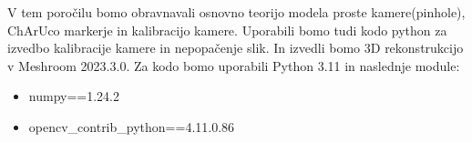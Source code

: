 V tem poročilu bomo obravnavali osnovno teorijo modela proste kamere(pinhole), ChArUco markerje in kalibracijo kamere. Uporabili bomo tudi kodo python za izvedbo kalibracije kamere in nepopačenje slik. In izvedli bomo 3D rekonstrukcijo v Meshroom 2023.3.0. Za kodo bomo uporabili Python 3.11 in naslednje module:
\begin{itemize}
    \item numpy==1.24.2
    \item opencv\_contrib\_python==4.11.0.86
\end{itemize}